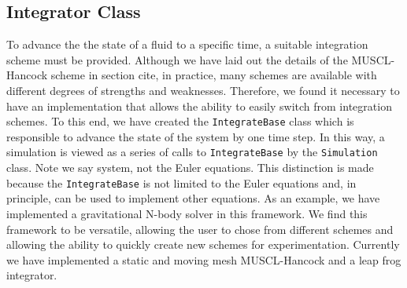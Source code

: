 \subsection{Integrator Class}
\label{sec.integrator}
To advance the the state of a fluid to a specific time, a suitable integration
scheme must be provided. Although we have laid out the details of the MUSCL-Hancock scheme
in section cite, in practice, many schemes are available with different degrees of 
strengths and weaknesses. Therefore, we found it necessary to have an implementation
that allows the ability to easily switch from integration schemes. To this end, we have
created the \lstinline{IntegrateBase} class which is responsible to advance the state
of the system by one time step. In this way, a simulation is viewed as a series of calls
to \lstinline{IntegrateBase} by the \lstinline{Simulation} class.
Note we say system, not the Euler equations. This
distinction is made because the \lstinline{IntegrateBase} is not limited to the Euler
equations and, in principle, can be used to implement other equations. As an example,
we have implemented a gravitational N-body solver in this framework. We find
this framework to be versatile, allowing the user to chose from different schemes
and allowing the ability to quickly create new schemes for experimentation.
Currently we have implemented a static and moving mesh MUSCL-Hancock and a leap
frog integrator.

